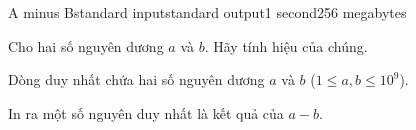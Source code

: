 \begin{problem}{A minus B}{standard input}{standard output}{1 second}{256 megabytes}

Cho hai số nguyên dương $a$ và $b$. Hãy tính hiệu của chúng.

\InputFile
Dòng duy nhất chứa hai số nguyên dương $a$ và $b$ ($1 \le a, b \le 10^9$).

\OutputFile
In ra một số nguyên duy nhất là kết quả của $a - b$.

\Example
\begin{example}
%
\end{example}

\end{problem}
